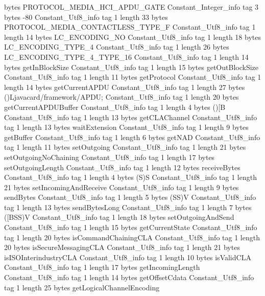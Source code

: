 {{{			bytes	PROTOCOL_MEDIA_HCI_APDU_GATE
		}
		Constant_Integer_info {
			tag	3
			bytes	-80
		}
		Constant_Utf8_info {
			tag	1
			length	33
			bytes	PROTOCOL_MEDIA_CONTACTLESS_TYPE_F
		}
		Constant_Utf8_info {
			tag	1
			length	14
			bytes	LC_ENCODING_NO
		}
		Constant_Utf8_info {
			tag	1
			length	18
			bytes	LC_ENCODING_TYPE_4
		}
		Constant_Utf8_info {
			tag	1
			length	26
			bytes	LC_ENCODING_TYPE_4_TYPE_16
		}
		Constant_Utf8_info {
			tag	1
			length	14
			bytes	getInBlockSize
		}
		Constant_Utf8_info {
			tag	1
			length	15
			bytes	getOutBlockSize
		}
		Constant_Utf8_info {
			tag	1
			length	11
			bytes	getProtocol
		}
		Constant_Utf8_info {
			tag	1
			length	14
			bytes	getCurrentAPDU
		}
		Constant_Utf8_info {
			tag	1
			length	27
			bytes	()Ljavacard/framework/APDU;
		}
		Constant_Utf8_info {
			tag	1
			length	20
			bytes	getCurrentAPDUBuffer
		}
		Constant_Utf8_info {
			tag	1
			length	4
			bytes	()[B
		}
		Constant_Utf8_info {
			tag	1
			length	13
			bytes	getCLAChannel
		}
		Constant_Utf8_info {
			tag	1
			length	13
			bytes	waitExtension
		}
		Constant_Utf8_info {
			tag	1
			length	9
			bytes	getBuffer
		}
		Constant_Utf8_info {
			tag	1
			length	6
			bytes	getNAD
		}
		Constant_Utf8_info {
			tag	1
			length	11
			bytes	setOutgoing
		}
		Constant_Utf8_info {
			tag	1
			length	21
			bytes	setOutgoingNoChaining
		}
		Constant_Utf8_info {
			tag	1
			length	17
			bytes	setOutgoingLength
		}
		Constant_Utf8_info {
			tag	1
			length	12
			bytes	receiveBytes
		}
		Constant_Utf8_info {
			tag	1
			length	4
			bytes	(S)S
		}
		Constant_Utf8_info {
			tag	1
			length	21
			bytes	setIncomingAndReceive
		}
		Constant_Utf8_info {
			tag	1
			length	9
			bytes	sendBytes
		}
		Constant_Utf8_info {
			tag	1
			length	5
			bytes	(SS)V
		}
		Constant_Utf8_info {
			tag	1
			length	13
			bytes	sendBytesLong
		}
		Constant_Utf8_info {
			tag	1
			length	7
			bytes	([BSS)V
		}
		Constant_Utf8_info {
			tag	1
			length	18
			bytes	setOutgoingAndSend
		}
		Constant_Utf8_info {
			tag	1
			length	15
			bytes	getCurrentState
		}
		Constant_Utf8_info {
			tag	1
			length	20
			bytes	isCommandChainingCLA
		}
		Constant_Utf8_info {
			tag	1
			length	20
			bytes	isSecureMessagingCLA
		}
		Constant_Utf8_info {
			tag	1
			length	21
			bytes	isISOInterindustryCLA
		}
		Constant_Utf8_info {
			tag	1
			length	10
			bytes	isValidCLA
		}
		Constant_Utf8_info {
			tag	1
			length	17
			bytes	getIncomingLength
		}
		Constant_Utf8_info {
			tag	1
			length	14
			bytes	getOffsetCdata
		}
		Constant_Utf8_info {
			tag	1
			length	25
			bytes	getLogicalChannelEncoding
}}}
